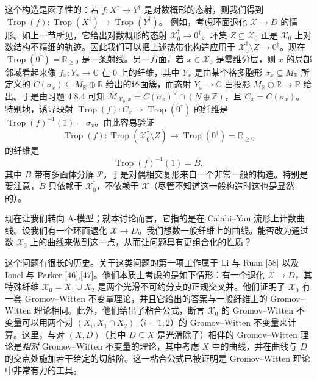 这个构造是函子性的：若 $f:X^\dagger\to Y^\dagger$ 是对数概形的态射，则我们得到 $\operatorname{Trop}(f):\operatorname{Trop}(X^\dagger)\to\operatorname{Trop}(Y^\dagger)$。
例如，考虑环面退化 $\mathcal{X}\to D$ 的情形。如上一节所见，它给出对数概形的态射 $\mathcal{X}_0^\dagger\to 0^\dagger$。坏集 $Z\subseteq\mathcal{X}_0$ 正是 $\mathcal{X}_0$ 上对数结构不精细的轨迹。因此我们可以把上述热带化构造应用于 $\mathcal{X}_0^\dagger\setminus Z\to 0^\dagger$。现在 $\operatorname{Trop}(0^\dagger)=\mathbb{R}_{\ge 0}$ 是一条射线。另一方面，若 $x\in\mathcal{X}_0$ 是零维分层，则 $x$ 的局部邻域看起来像 $f_x:Y_x\to\mathbb{C}$ 在 $0$ 上的纤维，其中 $Y_x$ 是由某个格多胞形 $\sigma_x\subseteq M_{\mathbb{R}}$ 所定义的 $C(\sigma_x)\subseteq M_{\mathbb{R}}\oplus\mathbb{R}$ 给出的环面簇，而态射 $Y_x\to\mathbb{C}$ 由投影 $M_{\mathbb{R}}\oplus\mathbb{R}\to\mathbb{R}$ 给出。于是由习题 4.8.4 可知 $\overline{\mathcal{M}}_{\mathcal{X}_0,x}=C(\sigma_x)^\vee\cap(N\oplus\mathbb{Z})$，且 $C_x=C(\sigma_x)$。特别地，诱导映射 $\operatorname{Trop}(f):C_x\to\operatorname{Trop}(0^\dagger)$ 的纤维是 $\operatorname{Trop}(f)^{-1}(1)=\sigma_x$。由此容易验证
\[
\operatorname{Trop}(f):\operatorname{Trop}(\mathcal{X}_0^\dagger\setminus Z)\to\operatorname{Trop}(0^\dagger)=\mathbb{R}_{\ge 0}
\]
的纤维是
\[
\operatorname{Trop}(f)^{-1}(1)=B,
\]
其中 $B$ 带有多面体分解 $\mathcal{P}$。于是对偶相交复形来自一个非常一般的构造。特别是要注意，$B$ 只依赖于 $\mathcal{X}_0^\dagger$，不依赖于 $\mathcal{X}$（尽管不知道这一般构造时这也是显然的）。

现在让我们转向 A-模型；就本讨论而言，它指的是在 Calabi--Yau 流形上计数曲线。设我们有一个环面退化 $\mathcal{X}\to D$。我们想数一般纤维上的曲线。能否改为通过数 $\mathcal{X}_0$ 上的曲线来做到这一点，从而让问题具有更组合化的性质？

这个问题有很长的历史。关于这类问题的第一项工作属于 Li 与 Ruan [58] 以及 Ionel 与 Parker [46],[47]。他们本质上考虑的是如下情形：有一个退化 $\mathcal{X}\to D$，其特殊纤维 $\mathcal{X}_0=X_1\cup X_2$ 是两个光滑不可约分支的正规交叉并。他们证明了 $\mathcal{X}_0$ 有一套 Gromov--Witten 不变量理论，并且它给出的答案与一般纤维上的 Gromov--Witten 理论相同。此外，他们给出了粘合公式，断言 $\mathcal{X}_0$ 的 Gromov--Witten 不变量可以用两个对 $(X_i,X_1\cap X_2)$（$i=1,2$）的 Gromov--Witten 不变量来计算。这里，与对 $(X,D)$（其中 $D\subseteq X$ 是光滑除子）相伴的 Gromov--Witten 理论是\emph{相对} Gromov--Witten 不变量的理论，其中考虑 $X$ 中的曲线，并在曲线与 $D$ 的交点处施加若干给定的切触阶。这一粘合公式已被证明是 Gromov--Witten 理论中非常有力的工具。

